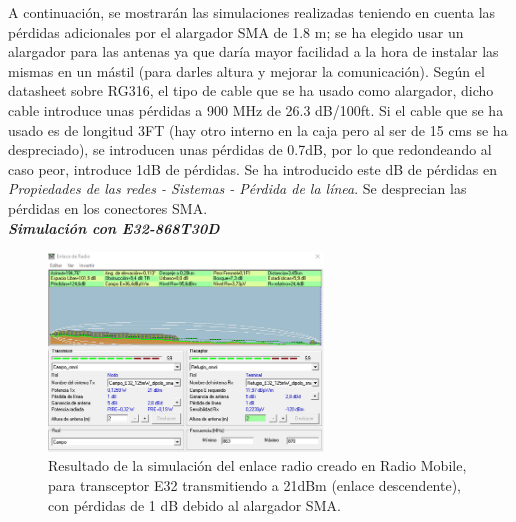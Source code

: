 \documentclass[12pt]{article}
\begin{document}
	\noindent A continuación, se mostrarán las simulaciones realizadas teniendo en cuenta las pérdidas adicionales por el alargador SMA de 1.8 m; se ha elegido usar un alargador para las antenas ya que daría mayor facilidad a la hora de instalar las mismas en un mástil (para darles altura y mejorar la comunicación). Según el datasheet sobre RG316, el tipo de cable que se ha usado como alargador, dicho cable introduce unas pérdidas a 900 MHz de 26.3 dB/100ft. Si el cable que se ha usado es de longitud 3FT (hay otro interno en la caja pero al ser de 15 cms se ha despreciado), se introducen unas pérdidas de 0.7dB, por lo que redondeando al caso peor, introduce 1dB de pérdidas. Se ha introducido este dB de pérdidas en \textit{Propiedades de las redes - Sistemas - Pérdida de la línea}. Se desprecian las pérdidas en los conectores SMA.\\
	
	\noindent \textit{\textbf{Simulación con E32-868T30D}} \\
	
	\begin{figure}[h!]
		\begin{center}
			\includegraphics[width=0.65\textwidth]{img/resultado_e32_125mW_conPerdidas_desc.png}
			\caption{Resultado de la simulación del enlace radio creado en Radio Mobile, para transceptor E32 transmitiendo a 21dBm (enlace descendente), con pérdidas de 1 dB debido al alargador SMA.}
			\label{fig: resultado enlace e32 125mW descendente con perdidas radio mobile}
		\end{center}
	\end{figure}
	
	\pagebreak
	
	
\end{document}
